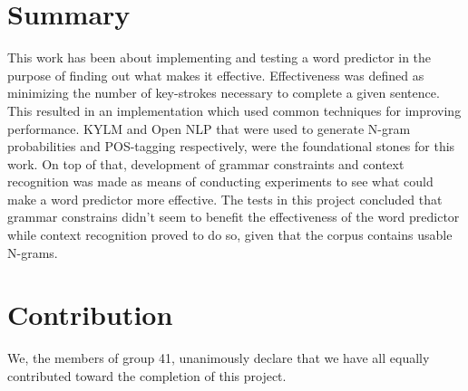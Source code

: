 \section{Summary}
This work has been about implementing and testing a word predictor in the purpose of finding out what makes it effective. Effectiveness was defined as minimizing the number of key-strokes necessary to complete a given sentence. This resulted in an implementation which used common techniques for improving performance. KYLM and Open NLP that were used to generate N-gram probabilities and POS-tagging respectively, were the foundational stones for this work. On top of that, development of grammar constraints and context recognition was made as means of conducting experiments to see what could make a word predictor more effective. The tests in this project concluded that grammar constrains didn’t seem to benefit the effectiveness of the word predictor while context recognition proved to do so, given that the corpus contains usable N-grams.  
\section{Contribution}
We, the members of group 41, unanimously declare that we have all equally contributed toward the completion of this project.
